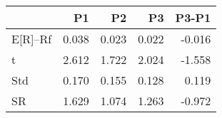 \begin{tabular}{lrrrr}
\toprule
 & P1 & P2 & P3 & P3-P1 \\
\midrule
E[R]--Rf & 0.038 & 0.023 & 0.022 & -0.016 \\
t & 2.612 & 1.722 & 2.024 & -1.558 \\
Std & 0.170 & 0.155 & 0.128 & 0.119 \\
SR & 1.629 & 1.074 & 1.263 & -0.972 \\
\bottomrule
\end{tabular}
